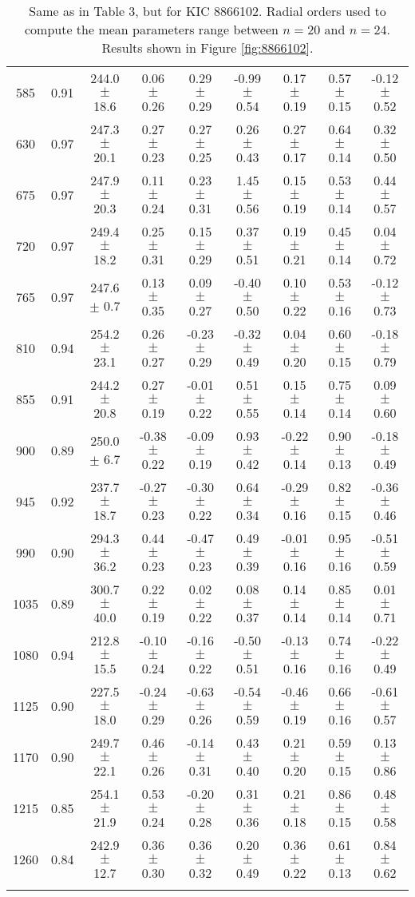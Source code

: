 \documentclass[twocolumn]{aastex61}%
\begin{document}
\begin{table*}[ht]
\begin{tabular}{ccc|ccccc|c}
585 & 0.91 & 244.0 $\pm$ 18.6 & 0.06 $\pm$ 0.26 & 0.29 $\pm$ 0.29 & -0.99 $\pm$ 0.54 & 0.17 $\pm$ 0.19 & 0.57 $\pm$ 0.15 & -0.12 $\pm$ 0.52\\
630 & 0.97 & 247.3 $\pm$ 20.1 & 0.27 $\pm$ 0.23 & 0.27 $\pm$ 0.25 & 0.26 $\pm$ 0.43 & 0.27 $\pm$ 0.17 & 0.64 $\pm$ 0.14 & 0.32 $\pm$ 0.50\\
675 & 0.97 & 247.9 $\pm$ 20.3 & 0.11 $\pm$ 0.24 & 0.23 $\pm$ 0.31 & 1.45 $\pm$ 0.56 & 0.15 $\pm$ 0.19 & 0.53 $\pm$ 0.14 & 0.44 $\pm$ 0.57\\
720 & 0.97 & 249.4 $\pm$ 18.2 & 0.25 $\pm$ 0.31 & 0.15 $\pm$ 0.29 & 0.37 $\pm$ 0.51 & 0.19 $\pm$ 0.21 & 0.45 $\pm$ 0.14 & 0.04 $\pm$ 0.72\\
765 & 0.97 & 247.6 $\pm$ 0.7 & 0.13 $\pm$ 0.35 & 0.09 $\pm$ 0.27 & -0.40 $\pm$ 0.50 & 0.10 $\pm$ 0.22 & 0.53 $\pm$ 0.16 & -0.12 $\pm$ 0.73\\
810 & 0.94 & 254.2 $\pm$ 23.1 & 0.26 $\pm$ 0.27 & -0.23 $\pm$ 0.29 & -0.32 $\pm$ 0.49 & 0.04 $\pm$ 0.20 & 0.60 $\pm$ 0.15 & -0.18 $\pm$ 0.79\\
855 & 0.91 & 244.2 $\pm$ 20.8 & 0.27 $\pm$ 0.19 & -0.01 $\pm$ 0.22 & 0.51 $\pm$ 0.55 & 0.15 $\pm$ 0.14 & 0.75 $\pm$ 0.14 & 0.09 $\pm$ 0.60\\
900 & 0.89 & 250.0 $\pm$ 6.7 & -0.38 $\pm$ 0.22 & -0.09 $\pm$ 0.19 & 0.93 $\pm$ 0.42 & -0.22 $\pm$ 0.14 & 0.90 $\pm$ 0.13 & -0.18 $\pm$ 0.49\\
945 & 0.92 & 237.7 $\pm$ 18.7 & -0.27 $\pm$ 0.23 & -0.30 $\pm$ 0.22 & 0.64 $\pm$ 0.34 & -0.29 $\pm$ 0.16 & 0.82 $\pm$ 0.15 & -0.36 $\pm$ 0.46\\
990 & 0.90 & 294.3 $\pm$ 36.2 & 0.44 $\pm$ 0.23 & -0.47 $\pm$ 0.23 & 0.49 $\pm$ 0.39 & -0.01 $\pm$ 0.16 & 0.95 $\pm$ 0.16 & -0.51 $\pm$ 0.59\\
1035 & 0.89 & 300.7 $\pm$ 40.0 & 0.22 $\pm$ 0.19 & 0.02 $\pm$ 0.22 & 0.08 $\pm$ 0.37 & 0.14 $\pm$ 0.14 & 0.85 $\pm$ 0.14 & 0.01 $\pm$ 0.71\\
1080 & 0.94 & 212.8 $\pm$ 15.5 & -0.10 $\pm$ 0.24 & -0.16 $\pm$ 0.22 & -0.50 $\pm$ 0.51 & -0.13 $\pm$ 0.16 & 0.74 $\pm$ 0.16 & -0.22 $\pm$ 0.49\\
1125 & 0.90 & 227.5 $\pm$ 18.0 & -0.24 $\pm$ 0.29 & -0.63 $\pm$ 0.26 & -0.54 $\pm$ 0.59 & -0.46 $\pm$ 0.19 & 0.66 $\pm$ 0.16 & -0.61 $\pm$ 0.57\\
1170 & 0.90 & 249.7 $\pm$ 22.1 & 0.46 $\pm$ 0.26 & -0.14 $\pm$ 0.31 & 0.43 $\pm$ 0.40 & 0.21 $\pm$ 0.20 & 0.59 $\pm$ 0.15 & 0.13 $\pm$ 0.86\\
1215 & 0.85 & 254.1 $\pm$ 21.9 & 0.53 $\pm$ 0.24 & -0.20 $\pm$ 0.28 & 0.31 $\pm$ 0.36 & 0.21 $\pm$ 0.18 & 0.86 $\pm$ 0.15 & 0.48 $\pm$ 0.58\\
1260 & 0.84 & 242.9 $\pm$ 12.7 & 0.36 $\pm$ 0.30 & 0.36 $\pm$ 0.32 & 0.20 $\pm$ 0.49 & 0.36 $\pm$ 0.22 & 0.61 $\pm$ 0.13 & 0.84 $\pm$ 0.62\\\vspace{-0.3cm}
\end{tabular}
\caption{Same as in Table 3, but for KIC 8866102. Radial orders used to compute the mean parameters range between $n=20$ and $n=24$. Results shown in Figure \ref{fig:8866102}.}\label{tab:8866102}
\end{table*}
\end{document}
